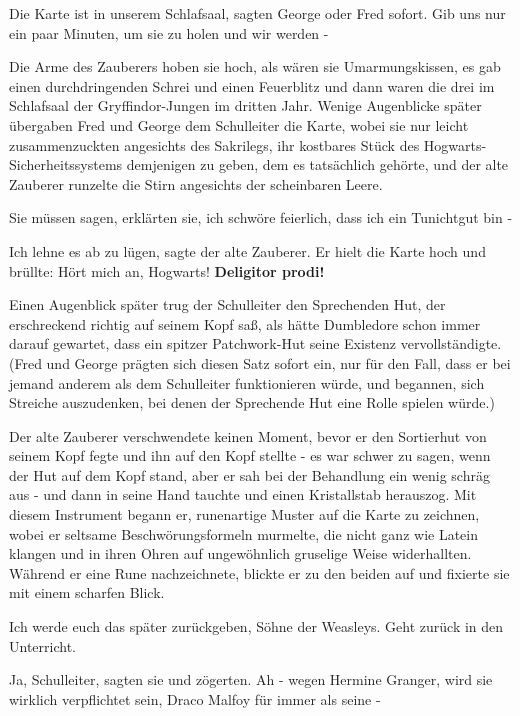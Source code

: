\glqq Die Karte ist in unserem Schlafsaal\grqq{}, sagten George oder Fred
sofort. \glqq Gib uns nur ein paar Minuten, um sie zu holen und wir werden
-\grqq{}

Die Arme des Zauberers hoben sie hoch, als wären sie Umarmungskissen, es gab
einen durchdringenden Schrei und einen Feuerblitz und dann waren die drei im
Schlafsaal der Gryffindor-Jungen im dritten Jahr. Wenige Augenblicke später
übergaben Fred und George dem Schulleiter die Karte, wobei sie nur leicht
zusammenzuckten angesichts des Sakrilegs, ihr kostbares Stück des
Hogwarts-Sicherheitssystems demjenigen zu geben, dem es tatsächlich gehörte, und
der alte Zauberer runzelte die Stirn angesichts der scheinbaren Leere.

\glqq Sie müssen sagen\grqq{}, erklärten sie, \glqq ich schwöre feierlich, dass
ich ein Tunichtgut bin -\grqq{}

\glqq Ich lehne es ab zu lügen\grqq{}, sagte der alte Zauberer. Er hielt die
Karte hoch und brüllte: \glqq Hört mich an, Hogwarts! \textbf{Deligitor
prodi!}\grqq{}

Einen Augenblick später trug der Schulleiter den Sprechenden Hut, der
erschreckend richtig auf seinem Kopf saß, als hätte Dumbledore schon immer
darauf gewartet, dass ein spitzer Patchwork-Hut seine Existenz vervollständigte.
(Fred und George prägten sich diesen Satz sofort ein, nur für den Fall, dass er
bei jemand anderem als dem Schulleiter funktionieren würde, und begannen, sich
Streiche auszudenken, bei denen der Sprechende Hut eine Rolle spielen würde.)

Der alte Zauberer verschwendete keinen Moment, bevor er den Sortierhut von
seinem Kopf fegte und ihn auf den Kopf stellte - es war schwer zu sagen, wenn
der Hut auf dem Kopf stand, aber er sah bei der Behandlung ein wenig schräg aus
- und dann in seine Hand tauchte und einen Kristallstab herauszog. Mit diesem
Instrument begann er, runenartige Muster auf die Karte zu zeichnen, wobei er
seltsame Beschwörungsformeln murmelte, die nicht ganz wie Latein klangen und in
ihren Ohren auf ungewöhnlich gruselige Weise widerhallten. Während er eine Rune
nachzeichnete, blickte er zu den beiden auf und fixierte sie mit einem scharfen
Blick.

\glqq Ich werde euch das später zurückgeben, Söhne der Weasleys. Geht zurück in
den Unterricht.\grqq{}

\glqq Ja, Schulleiter\grqq{}, sagten sie und zögerten. \glqq Ah - wegen Hermine
Granger, wird sie wirklich verpflichtet sein, Draco Malfoy für immer als seine
-\grqq{}

